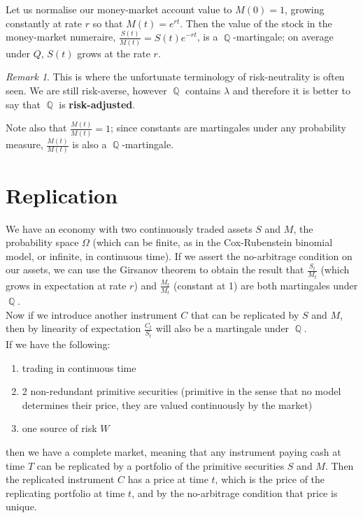 \documentclass[11pt]{article}
\theoremstyle{definition}
\theoremstyle{remark}
\newtheorem{remark}{Remark}
\DeclareMathOperator{\Que}{\mathbb{Q}}
\begin{document}
Let us normalise our money-market account value to $M(0) = 1$, growing constantly at rate $r$ so that $M(t) = e^{rt}$. Then the value of the stock in the money-market numeraire, $\frac{S(t)}{M(t)} = S(t)e^{-rt}$, is a $\Que$-martingale; on average under $Q$, $S(t)$ grows at the rate $r$. \\

\begin{remark}
This is where the unfortunate terminology of risk-neutrality is often seen. We are still risk-averse, however $\Que$ contains $\lambda$ and therefore it is better to say that $\Que$ is {\bf risk-adjusted}.
\end{remark}

Note also that $\frac{M(t)}{M(t)} = 1$; since constants are martingales under any probability measure, $\frac{M(t)}{M(t)}$ is also a $\Que$-martingale.

\section{Replication}

We have an economy with two continuously traded assets $S$ and $M$, the probability space $\Omega$ (which can be finite, as in the Cox-Rubenstein binomial model, or infinite, in continuous time). If we assert the no-arbitrage condition on our assets, we can use the Girsanov theorem to obtain the result that $\frac{S_t}{M_t}$ (which grows in expectation at rate $r$) and $\frac{M_t}{M_t}$ (constant at 1) are both martingales under $\Que$. \\

Now if we introduce another instrument $C$ that can be replicated by $S$ and $M$, then by linearity of expectation $\frac{C_t}{S_t}$ will also be a martingale under $\Que$. \\

If we have the following:
\begin{enumerate}
\item trading in continuous time
\item 2 non-redundant primitive securities (primitive in the sense that no model determines their price, they are valued continuously by the market)
\item one source of risk $W$
\end{enumerate}
then we have a complete market, meaning that any instrument paying cash at time $T$ can be replicated by a portfolio of the primitive securities $S$ and $M$. Then the replicated instrument $C$ has a price at time $t$, which is the price of the replicating portfolio at time $t$, and by the no-arbitrage condition that price is unique.
\end{document}
